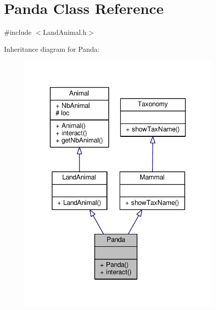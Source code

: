 \hypertarget{classPanda}{}\section{Panda Class Reference}
\label{classPanda}


{\ttfamily \#include $<$Land\+Animal.\+h$>$}



Inheritance diagram for Panda\+:
\nopagebreak
\begin{figure}[H]
\begin{center}
\leavevmode
\includegraphics[width=284pt]{classPanda__inherit__graph}
\end{center}
\end{figure}


